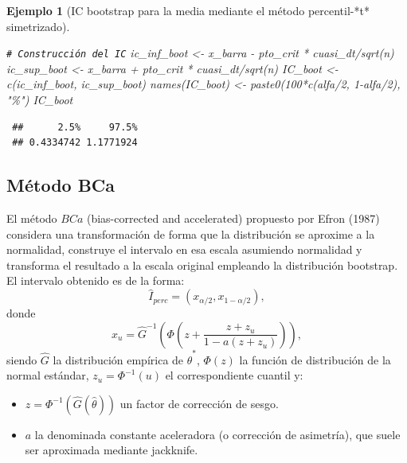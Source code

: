 \documentclass[
]{book}
\newenvironment{Shaded}{\begin{snugshade}}{\end{snugshade}}
\newcommand{\CommentTok}[1]{\textcolor[rgb]{0.56,0.35,0.01}{\textit{#1}}}
\newcommand{\DecValTok}[1]{\textcolor[rgb]{0.00,0.00,0.81}{#1}}
\newcommand{\FunctionTok}[1]{\textcolor[rgb]{0.00,0.00,0.00}{#1}}
\newcommand{\NormalTok}[1]{#1}
\newcommand{\OtherTok}[1]{\textcolor[rgb]{0.56,0.35,0.01}{#1}}
\newcommand{\SpecialCharTok}[1]{\textcolor[rgb]{0.00,0.00,0.00}{#1}}
\newcommand{\StringTok}[1]{\textcolor[rgb]{0.31,0.60,0.02}{#1}}
\providecommand{\tightlist}{%
  \setlength{\itemsep}{0pt}\setlength{\parskip}{0pt}}
\theoremstyle{break}
\newtheorem{example}{Ejemplo}[chapter]
\theoremstyle{nonumberplain}
\renewcommand{\CommentTok}[1]{\textcolor[rgb]{0.41,0.41,0.41}{\texttt{#1}}}
\begin{document}
\begin{example}[IC bootstrap para la media mediante el método percentil-*t* simetrizado]
\begin{Shaded}
\begin{Highlighting}[]
\CommentTok{\# Construcción del IC}
\NormalTok{ic\_inf\_boot }\OtherTok{\textless{}{-}}\NormalTok{ x\_barra }\SpecialCharTok{{-}}\NormalTok{ pto\_crit }\SpecialCharTok{*}\NormalTok{ cuasi\_dt}\SpecialCharTok{/}\FunctionTok{sqrt}\NormalTok{(n)}
\NormalTok{ic\_sup\_boot }\OtherTok{\textless{}{-}}\NormalTok{ x\_barra }\SpecialCharTok{+}\NormalTok{ pto\_crit }\SpecialCharTok{*}\NormalTok{ cuasi\_dt}\SpecialCharTok{/}\FunctionTok{sqrt}\NormalTok{(n)}
\NormalTok{IC\_boot }\OtherTok{\textless{}{-}} \FunctionTok{c}\NormalTok{(ic\_inf\_boot, ic\_sup\_boot)}
\FunctionTok{names}\NormalTok{(IC\_boot) }\OtherTok{\textless{}{-}} \FunctionTok{paste0}\NormalTok{(}\DecValTok{100}\SpecialCharTok{*}\FunctionTok{c}\NormalTok{(alfa}\SpecialCharTok{/}\DecValTok{2}\NormalTok{, }\DecValTok{1}\SpecialCharTok{{-}}\NormalTok{alfa}\SpecialCharTok{/}\DecValTok{2}\NormalTok{), }\StringTok{"\%"}\NormalTok{)}
\NormalTok{IC\_boot}
\end{Highlighting}
\end{Shaded}

\begin{verbatim}
 ##      2.5%     97.5% 
 ## 0.4334742 1.1771924
\end{verbatim}

\end{example}

\hypertarget{boot-ic-bca}{%
\subsection{Método BCa}\label{boot-ic-bca}}

El método \(BCa\) (bias-corrected and accelerated) propuesto por Efron (1987) considera una transformación de forma que la distribución se aproxime a la normalidad, construye el intervalo en esa escala asumiendo normalidad y transforma el resultado a la escala original empleando la distribución bootstrap.
El intervalo obtenido es de la forma:
\[\hat{I}_{perc}=\left( x_{\alpha /2}, x_{1-\alpha /2}  \right),\]
donde\\
\[x_u = \hat G^{-1}\left(\Phi\left(z + \frac{z + z_u}{1-a(z+z_u)}\right)  \right),\]
siendo \(\hat G\) la distribución empírica de \(\hat{\theta}^{\ast}\), \(\Phi(z)\) la función de distribución de la normal estándar, \(z_u = \Phi^{-1}(u)\) el correspondiente cuantil y:

\begin{itemize}
\tightlist
\item
  \(z = \Phi^{-1}(\hat G(\hat\theta))\) un factor de corrección de sesgo.
\item
  \(a\) la denominada constante aceleradora (o corrección de asimetría), que suele ser aproximada mediante jackknife.
\end{itemize}
\end{document}
